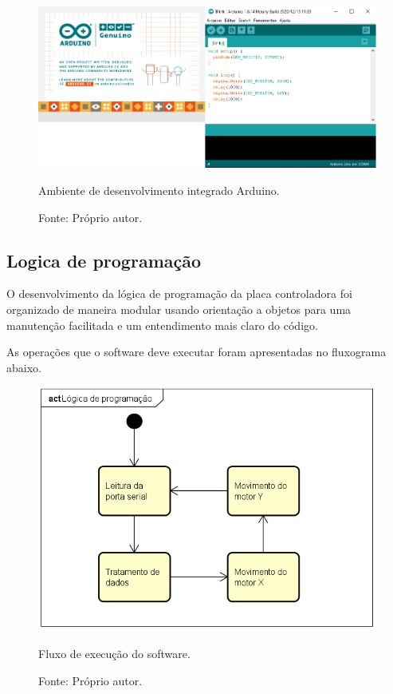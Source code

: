 \begin{figure}[!htb]
\centering
\includegraphics[scale = 0.6]{figuras/idearduino}
\caption{Ambiente de desenvolvimento integrado Arduino.}
\caption*{Fonte: Próprio autor.}
\label{fig:idearduino}
\end{figure}
    
\subsection{Logica de programação}\label{subsec:metlogica}

O desenvolvimento da lógica de programação da placa controladora foi organizado de maneira modular 
usando orientação a objetos para uma manutenção facilitada e um entendimento mais claro do código.

As operações que o software deve executar foram apresentadas no fluxograma abaixo.

\begin{figure}[!htb]
\centering
\includegraphics[scale = 0.7]{figuras/fluxoexecucao}
\caption{Fluxo de execução do software.}
\caption*{Fonte: Próprio autor.}
\label{fig:fluxoexecucao}
\end{figure}
    
